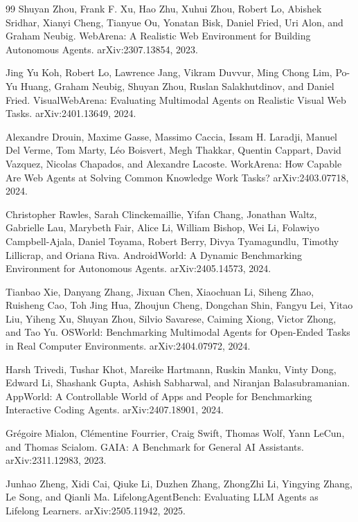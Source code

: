 \documentclass{article}
\begin{document}
\begin{thebibliography}{99}
Shuyan Zhou, Frank F. Xu, Hao Zhu, Xuhui Zhou, Robert Lo, Abishek Sridhar, Xianyi Cheng, Tianyue Ou, Yonatan Bisk, Daniel Fried, Uri Alon, and Graham Neubig.
\newblock WebArena: A Realistic Web Environment for Building Autonomous Agents.
\newblock arXiv:2307.13854, 2023.

Jing Yu Koh, Robert Lo, Lawrence Jang, Vikram Duvvur, Ming Chong Lim, Po-Yu Huang, Graham Neubig, Shuyan Zhou, Ruslan Salakhutdinov, and Daniel Fried.
\newblock VisualWebArena: Evaluating Multimodal Agents on Realistic Visual Web Tasks.
\newblock arXiv:2401.13649, 2024.

Alexandre Drouin, Maxime Gasse, Massimo Caccia, Issam H. Laradji, Manuel Del Verme, Tom Marty, L\'eo Boisvert, Megh Thakkar, Quentin Cappart, David Vazquez, Nicolas Chapados, and Alexandre Lacoste.
\newblock WorkArena: How Capable Are Web Agents at Solving Common Knowledge Work Tasks?
\newblock arXiv:2403.07718, 2024.

Christopher Rawles, Sarah Clinckemaillie, Yifan Chang, Jonathan Waltz, Gabrielle Lau, Marybeth Fair, Alice Li, William Bishop, Wei Li, Folawiyo Campbell-Ajala, Daniel Toyama, Robert Berry, Divya Tyamagundlu, Timothy Lillicrap, and Oriana Riva.
\newblock AndroidWorld: A Dynamic Benchmarking Environment for Autonomous Agents.
\newblock arXiv:2405.14573, 2024.

Tianbao Xie, Danyang Zhang, Jixuan Chen, Xiaochuan Li, Siheng Zhao, Ruisheng Cao, Toh Jing Hua, Zhoujun Cheng, Dongchan Shin, Fangyu Lei, Yitao Liu, Yiheng Xu, Shuyan Zhou, Silvio Savarese, Caiming Xiong, Victor Zhong, and Tao Yu.
\newblock OSWorld: Benchmarking Multimodal Agents for Open-Ended Tasks in Real Computer Environments.
\newblock arXiv:2404.07972, 2024.

Harsh Trivedi, Tushar Khot, Mareike Hartmann, Ruskin Manku, Vinty Dong, Edward Li, Shashank Gupta, Ashish Sabharwal, and Niranjan Balasubramanian.
\newblock AppWorld: A Controllable World of Apps and People for Benchmarking Interactive Coding Agents.
\newblock arXiv:2407.18901, 2024.

Gr\'egoire Mialon, Cl\'ementine Fourrier, Craig Swift, Thomas Wolf, Yann LeCun, and Thomas Scialom.
\newblock GAIA: A Benchmark for General AI Assistants.
\newblock arXiv:2311.12983, 2023.

Junhao Zheng, Xidi Cai, Qiuke Li, Duzhen Zhang, ZhongZhi Li, Yingying Zhang, Le Song, and Qianli Ma.
\newblock LifelongAgentBench: Evaluating LLM Agents as Lifelong Learners.
\newblock arXiv:2505.11942, 2025.


\end{thebibliography}
\end{document}
